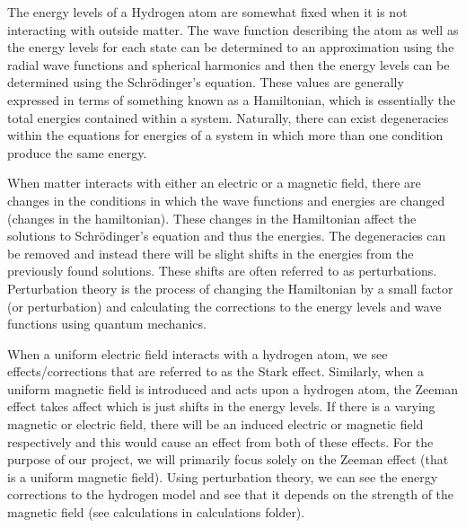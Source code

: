 \documentclass[11pt]{article}
\begin{document}
The energy levels of a Hydrogen atom are somewhat fixed when it is not interacting with outside matter. The wave function describing the atom as well as the energy levels for each state can be determined to an approximation using the radial wave functions and spherical harmonics and then the energy levels can be determined using the Schr\"{o}dinger's equation. These values are generally expressed in terms of something known as a Hamiltonian, which is essentially the total energies contained within a system. Naturally, there can exist degeneracies within the equations for energies of a system in which more than one condition produce the same energy.

When matter interacts with either an electric or a magnetic field, there are changes in the conditions in which the wave functions and energies are changed (changes in the hamiltonian). These changes in the Hamiltonian affect the solutions to Schr\"{o}dinger's equation and thus the energies. The degeneracies can be removed and instead there will be slight shifts in the energies from the previously found solutions. These shifts are often referred to as perturbations. Perturbation theory is the process of changing the Hamiltonian by a small factor (or perturbation) and calculating the corrections to the energy levels and wave functions using quantum mechanics. 

When a uniform electric field interacts with a hydrogen atom, we see effects/corrections that are referred to as the Stark effect. Similarly, when a uniform magnetic field is introduced and acts upon a hydrogen atom, the Zeeman effect takes affect which is just shifts in the energy levels. If there is a varying magnetic or electric field, there will be an induced electric or magnetic field respectively and this would cause an effect from both of these effects. For the purpose of our project, we will primarily focus solely on the Zeeman effect (that is a uniform magnetic field). Using perturbation theory, we can see the energy corrections to the hydrogen model and see that it depends on the strength of the magnetic field (see calculations in calculations folder).
\end{document}
